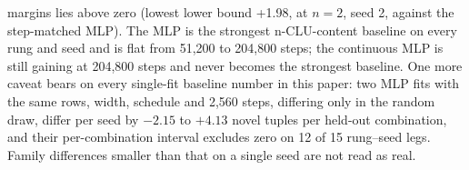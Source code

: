 \documentclass{article} %
\begin{document}
margins lies above zero (lowest lower bound +1.98, at $n=2$, seed 2, against the step-matched MLP). %
The MLP is the strongest n-CLU-content baseline on every rung and seed and is flat from 51,200 to %
204,800 steps; the continuous MLP is still gaining at 204,800 steps and never becomes the strongest %
baseline. One more caveat bears on every single-fit baseline number in this paper: two MLP fits with the
same rows, width, schedule and 2,560 steps, differing only in the random draw, differ per seed by %
$-2.15$ to $+4.13$ novel tuples per held-out combination, and their per-combination interval excludes zero on 12 of 15 %
rung--seed legs. Family differences smaller than that on a single seed are not read as real.
\end{document}
